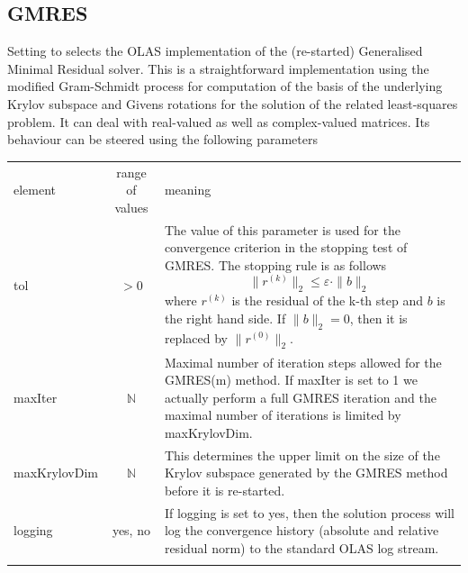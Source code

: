\subsection{GMRES}
\label{sec:gmres}
%
%
Setting  to  selects the OLAS implementation of the
(re-started) Generalised Minimal Residual solver. This is a straightforward
implementation using the modified Gram-Schmidt process for computation of the
basis of the underlying Krylov subspace and Givens rotations for the solution
of the related least-squares problem. It can deal with real-valued as well as
complex-valued matrices. Its behaviour can be steered using the following
parameters
%
%
\begin{center}
\begin{tabular}{lcp{}}
\hline\noalign{\smallskip}
element & range of values & meaning \\
\noalign{\smallskip}\hline\noalign{\smallskip}
tol & $> 0$ & The value of this parameter is used for the convergence criterion
              in the stopping test of GMRES. The stopping rule is as follows
	\begin{displaymath}
        \|r^{(k)}\|_2  \leq \varepsilon \cdot \|b\|_2
	\end{displaymath}
        where $r^{(k)}$ is the residual of the k-th step and $b$ is the right
        hand side. If $\|b\|_2=0$, then it is replaced by $\|r^{(0)}\|_2$.\\
\noalign{\smallskip}\hline\noalign{\smallskip}
maxIter & $\mathbb{N}$ & Maximal number of iteration steps allowed for the
                         GMRES(m) method. If maxIter is set to 1 we actually
	                 perform a full GMRES iteration and the maximal
	                 number of iterations is limited by maxKrylovDim.\\
\noalign{\smallskip}\hline\noalign{\smallskip}
maxKrylovDim & $\mathbb{N}$ & This determines the upper limit on the size of
	                      the Krylov subspace generated by the GMRES method
                              before it is re-started.\\
\noalign{\smallskip}\hline\noalign{\smallskip}
logging & yes, no & If logging is set to yes, then the solution process will
	            log the convergence history (absolute and relative residual
                    norm) to the standard OLAS log stream.\\
\noalign{\smallskip}\hline
\end{tabular}
\end{center}
%
%
%
